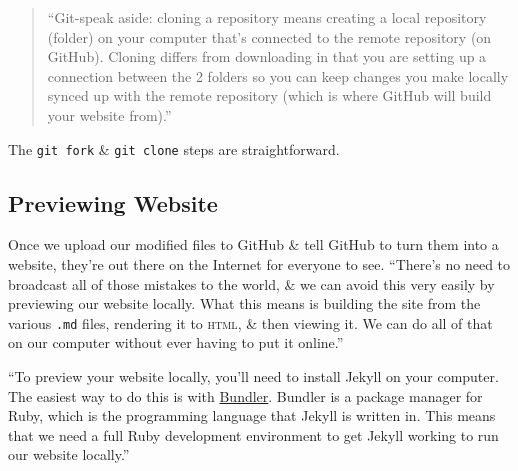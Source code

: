\documentclass{article}
\numberwithin{equation}{section}
\begin{document}
\begin{quotation}
	``Git-speak aside: cloning a repository means creating a local repository (folder) on your computer that's connected to the remote repository (on GitHub). Cloning differs from downloading in that you are setting up a connection between the 2 folders so you can keep changes you make locally synced up with the remote repository (which is where GitHub will build your website from).''
\end{quotation}
The \texttt{git fork} \& \texttt{git clone} steps are straightforward.

\subsection{Previewing Website}
Once we upload our modified files to GitHub \& tell GitHub to turn them into a website, they're out there on the Internet for everyone to see. ``There's no need to broadcast all of those mistakes to the world, \& we can avoid this very easily by previewing our website locally. What this means is building the site from the various \texttt{.md} files, rendering it to \textsc{html}, \& then viewing it. We can do all of that on our computer without ever having to put it online.''

``To preview your website locally, you'll need to install Jekyll on your computer. The easiest way to do this is with \href{https://bundler.io/}{Bundler}. Bundler is a package manager for Ruby, which is the programming language that Jekyll is written in. This means that we need a full Ruby development environment to get Jekyll working to run our website locally.''
\end{document}
